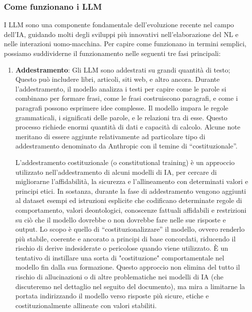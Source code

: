         \subsubsection{Come funzionano i LLM}
            I LLM sono una componente fondamentale dell'evoluzione recente nel campo dell'IA, guidando molti degli sviluppi più innovativi nell'elaborazione del NL e nelle interazioni uomo-macchina. Per capire come funzionano in termini semplici, possiamo suddividerne il funzionamento nelle seguenti tre fasi principali:
            \begin{enumerate}
                \item
                    \textbf{Addestramento}: Gli LLM sono addestrati su grandi quantità di testo; Questo può includere libri, articoli, siti web, e altro ancora. Durante l'addestramento, il modello analizza i testi per capire come le parole si combinano per formare frasi, come le frasi costruiscono paragrafi, e come i paragrafi possono esprimere idee complesse. Il modello impara le regole grammaticali, i significati delle parole, e le relazioni tra di esse. Questo processo richiede enormi quantità di dati e capacità di calcolo. Alcune note meritano di essere aggiunte relativamente ad particolare tipo di addestramento denominato da Anthropic con il temine di ``costituzionale''.
            
                    L'addestramento costituzionale (o constitutional training) è un approccio utilizzato nell'addestramento di alcuni modelli di IA, per cercare di migliorarne l'affidabilità, la sicurezza e l'allineamento con determinati valori e principi etici. In sostanza, durante la fase di addestramento vengono aggiunti al dataset esempi ed istruzioni esplicite che codificano determinate regole di comportamento, valori deontologici, conoscenze fattuali affidabili e restrizioni su ciò che il modello dovrebbe o non dovrebbe fare nelle sue risposte e output. Lo scopo è quello di ``costituzionalizzare'' il modello, ovvero renderlo più stabile, coerente e ancorato a principi di base concordati, riducendo il rischio di derive indesiderate o pericolose quando viene utilizzato. È un tentativo di instillare una sorta di "costituzione" comportamentale nel modello fin dalla sua formazione. Questo approccio non elimina del tutto il rischio di allucinazioni o di altre problematiche nei modelli di IA (che discuteremo nel dettaglio nel seguito del documento), ma mira a limitarne la portata indirizzando il modello verso risposte più sicure, etiche e costituzionalmente allineate con valori stabiliti.


\end{enumerate}
